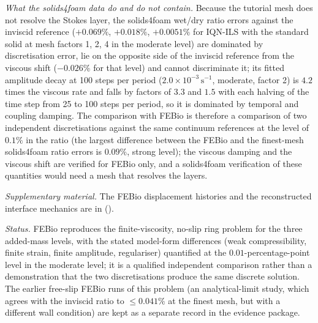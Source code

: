 \emph{What the solids4foam data do and do not contain.}
Because the tutorial mesh does not resolve the Stokes layer, the solids4foam wet/dry ratio errors against the inviscid reference ($+0.069\%$, $+0.018\%$, $+0.0051\%$ for IQN-ILS with the standard solid at mesh factors 1, 2, 4 in the moderate level) are dominated by discretisation error, lie on the opposite side of the inviscid reference from the viscous shift ($-0.026\%$ for that level) and cannot discriminate it; its fitted amplitude decay at 100 steps per period ($2.0\times10^{-3}\,\mathrm{s^{-1}}$, moderate, factor 2) is $4.2$ times the viscous rate and falls by factors of $3.3$ and $1.5$ with each halving of the time step from 25 to 100 steps per period, so it is dominated by temporal and coupling damping.
The comparison with FEBio is therefore a comparison of two independent discretisations against the same continuum references at the level of $0.1\%$ in the ratio (the largest difference between the FEBio and the finest-mesh solids4foam ratio errors is $0.09\%$, strong level); the viscous damping and the viscous shift are verified for FEBio only, and a solids4foam verification of these quantities would need a mesh that resolves the layers.

\emph{Supplementary material.}
The FEBio displacement histories and the reconstructed interface mechanics are in \suppRef{} (\suppFigBoth).

\emph{Status.}
FEBio reproduces the finite-viscosity, no-slip ring problem for the three added-mass levels, with the stated model-form differences (weak compressibility, finite strain, finite amplitude, regulariser) quantified at the $0.01$-percentage-point level in the moderate level; it is a qualified independent comparison rather than a demonstration that the two discretisations produce the same discrete solution.
The earlier free-slip FEBio runs of this problem (an analytical-limit study, which agrees with the inviscid ratio to $\leq0.041\%$ at the finest mesh, but with a different wall condition) are kept as a separate record in the evidence package.

